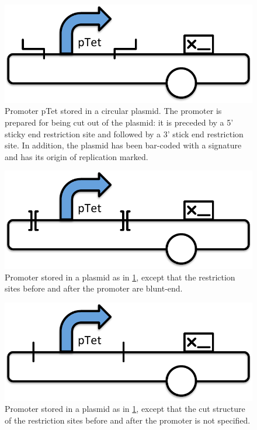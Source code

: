 \begin{figure}[h!]
\includegraphics[scale=0.5]{figures/apdx-examples/apdx-exa3.pdf}
\caption{Promoter pTet stored in a circular plasmid. The promoter is prepared for being cut out of the plasmid: it is preceded by a 5' sticky end restriction site and followed by a 3' stick end restriction site.  In addition, the plasmid has been bar-coded with a signature and has its origin of replication marked.}
\label{f:apdx:exa3}
\end{figure}

\begin{figure}[h!]
\includegraphics[scale=0.5]{figures/apdx-examples/apdx-exa4.pdf}
\caption{Promoter stored in a plasmid as in \ref{f:apdx:exa3}, except that the restriction sites before and after the promoter are blunt-end.}
\label{f:apdx:exa4}
\end{figure}

\begin{figure}[h!]
\includegraphics[scale=0.5]{figures/apdx-examples/apdx-exa5.pdf}
\caption{Promoter stored in a plasmid as in \ref{f:apdx:exa3}, except that the cut structure of the restriction sites before and after the promoter is not specified.}
\label{f:apdx:exa5}
\end{figure}

